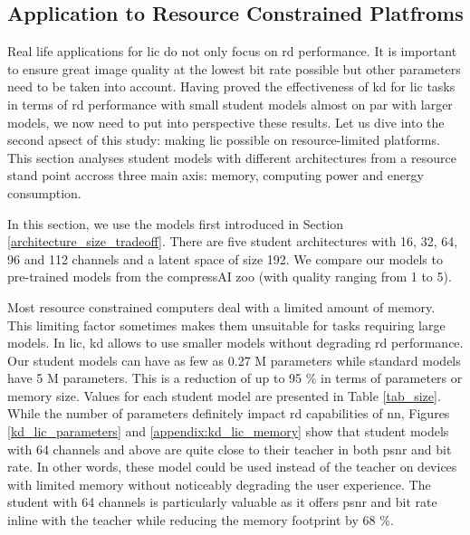 \subsection{Application to Resource Constrained Platfroms}
\label{application_resource_contrained_platforms}
Real life applications for \acrshort{lic} do not only focus on \acrshort{rd} performance. It is important to ensure great image quality at the lowest bit rate possible but other parameters need to be taken into account. Having proved the effectiveness of \acrshort{kd} for \acrshort{lic} tasks in terms of \acrshort{rd} performance with small student models almost on par with larger models, we now need to put into perspective these results. Let us dive into the second apsect of this study: making \acrshort{lic} possible on resource-limited platforms. This section analyses student models with different architectures from a resource stand point accross three main axis: memory, computing power and energy consumption.

In this section, we use the models first introduced in Section \ref{architecture_size_tradeoff}. There are five student architectures with 16, 32, 64, 96 and 112 channels and a latent space of size 192. We compare our models to pre-trained models from the compressAI zoo (with \textsf{quality} ranging from 1 to 5).

Most resource constrained computers deal with a limited amount of memory. This limiting factor sometimes makes them unsuitable for tasks requiring large models. In \acrshort{lic}, \acrshort{kd} allows to use smaller models without degrading \acrshort{rd} performance. Our student models can have as few as 0.27 M parameters while standard models have 5 M parameters. This is a reduction of up to 95 \% in terms of parameters or memory size. Values for each student model are presented in Table \ref{tab_size}. While the number of parameters definitely impact \acrshort{rd} capabilities of \acrshort{nn}, Figures \ref{kd_lic_parameters} and \ref{appendix:kd_lic_memory} show that student models with 64 channels and above are quite close to their teacher in both \acrshort{psnr} and bit rate. In other words, these model could be used instead of the teacher on devices with limited memory without noticeably degrading the user experience. The student with 64 channels is particularly valuable as it offers \acrshort{psnr} and bit rate inline with the teacher while reducing the memory footprint by 68 \%.

